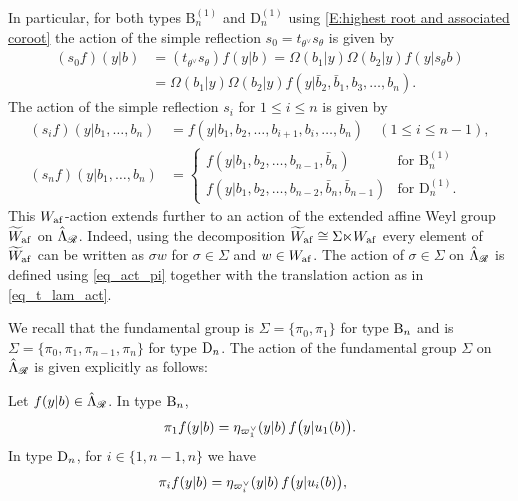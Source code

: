 \documentclass[a4paper]{amsart}
\theoremstyle{remark}
\numberwithin{equation}{section}
\begin{document}
In particular, for both types $\mathrm{B}_n^{(1)}$ and $\mathrm{D}_n^{(1)}$ using \eqref{E:highest root and associated coroot} the action of the simple reflection $s_0=t_{\theta^\lor}s_\theta$ is given by
\begin{align*}
(s_0 f)(y| b) &= (t_{\theta^\lor}s_\theta )f(y| b) 
=\Omega(b_1 |  y)\Omega(b_2 |  y) f(y| s_\theta b)\\
&= \Omega(b_1 |  y)\Omega(b_2 |  y) f(y|  \bar{b}_2, \bar{b}_1,b_3, \dotsc, b_n).
\end{align*}
The action of the simple reflection $s_i$ for $1\leq i\leq n$ is given by
\begin{align*}
(s_i f)(y| b_1,\dots,b_n)& = f(y|  b_1,b_2,\dots,b_{i+1},b_i, \dots, b_n)\quad (1\le i\le n-1),\\
(s_n f)(y| b_1,\dots,b_n) &=\begin{cases}
    f(y|  b_1,b_2, \dots,b_{n-1}, \bar{b}_n) &  \text{for $\mathrm{B}_n^{(1)}$}\\
     f(y|  b_1,b_2, \dots,b_{n-2}, \bar{b}_n,\bar{b}_{n-1}) & \text{for $\mathrm{D}_n^{(1)}$}.
\end{cases} 
\end{align*}
This \(W_{\mathrm{af}}\)-action extends further to an action of the extended affine Weyl group $\widetilde{W}_{\mathrm{af}}$ on $\hat{\Lambda}_{\mathscr{R}}$. Indeed, using the decomposition $\widetilde{W}_{\mathrm{af}}\cong \Sigma {\ltimes} W_{\mathrm{af}}$ every element of $\widetilde{W}_{\mathrm{af}}$ can be written as $\sigma w$ for $\sigma\in\Sigma$ and $w\in W_{\mathrm{af}}$.
The action of $\sigma\in \Sigma$ on $\hat{\Lambda}_{\mathscr{R}}$ is defined using \eqref{eq_act_pi} together with the translation action as in \eqref{eq_t_lam_act}.


We recall that the fundamental group is $\Sigma=\{\pi_0,\pi_1\}$ for type $\mathrm{B}_{n}$ and is $\Sigma=\{\pi_0,\pi_1,\pi_{n-1},\pi_n\}$ for type $\mathrm{D}_{n}$. The action of the fundamental group $\Sigma$ on {$\hat{\Lambda}_{\mathscr{R}}$} is given explicitly as follows:

 Let $f(y | b) \in \hat{\Lambda}_{\mathscr{R}}$. In type $\mathrm{B}_{n}$,
\[
\pi_{1} f(y | b)
   = \eta_{\varpi_1^\vee}(y | b)\, f\bigl(y | u_{1}(b)\bigr).\]
In type $\mathrm{D}_{n}$, for $i\in \{1,n-1,n\}$ we have
\begin{align*}
\pi_{i} f(y | b)
   &= \eta_{\varpi_i^\vee}(y | b)\, f\bigl(y | u_{i}(b)\bigr),
\end{align*}    
\end{document}
